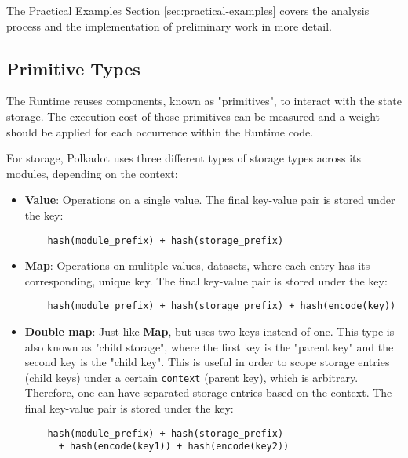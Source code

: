 \documentclass[11pt,a4paper]{article}
\begin{document}
The Practical Examples Section \ref{sec:practical-examples} covers the analysis
process and the implementation of preliminary work in more detail.

\subsection{Primitive Types}\label{sect:primitive-types}
The Runtime reuses components, known as "primitives", to interact with the state
storage. The execution cost of those primitives can be measured and a weight
should be applied for each occurrence within the Runtime code.
\newline

For storage, Polkadot uses three different types of storage types across its
modules, depending on the context:

\begin{itemize}
  \item \textbf{Value}: Operations on a single value. \newline\newline
  The final key-value pair is stored under the key:\newline
  \begin{verbatim}
    hash(module_prefix) + hash(storage_prefix)
  \end{verbatim}
  \item \textbf{Map}: Operations on mulitple values, datasets, where each entry
  has its corresponding, unique key. \newline\newline
  The final key-value pair is stored under the key:\newline
  \begin{verbatim}
    hash(module_prefix) + hash(storage_prefix) + hash(encode(key))
  \end{verbatim}
  \item \textbf{Double map}: Just like \textbf{Map}, but uses two keys instead
  of one. This type is also known as "child storage", where the first key is the
  "parent key" and the second key is the "child key". This is useful in order to
  scope storage entries (child keys) under a certain \verb|context| (parent
  key), which is arbitrary. Therefore, one can have separated storage entries
  based on the context.
  \newline\newline
  The final key-value pair is stored under the key:\newline
  \begin{verbatim}
    hash(module_prefix) + hash(storage_prefix)
      + hash(encode(key1)) + hash(encode(key2))
  \end{verbatim}
\end{itemize}
\end{document}
